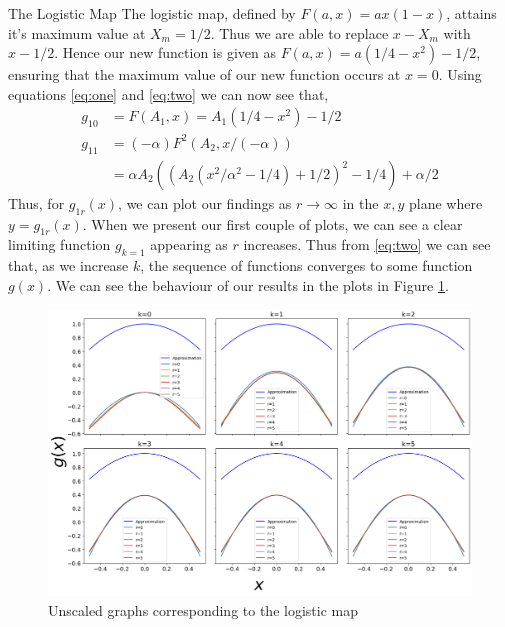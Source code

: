 \begin{exmp} The Logistic Map
	The logistic map, defined by $F(a,x)=ax(1-x)$, attains it's maximum value at $X_m =1/2$.
	Thus we are able to replace $x-X_m$ with $x-1/2$. Hence our new function is given as $F(a,x)=a(1/4-x^2)-1/2$, ensuring that the maximum value of our new function occurs at $x=0$. Using equations \eqref{eq:one} and \eqref{eq:two} we can now see that,
    \begin{align}
        g_{10}&=F(A_1,x)=A_1(1/4-x^2)-1/2 \nonumber \\
        g_{11}&=(-\alpha)F^2(A_2,x/(-\alpha)) \nonumber \\
        &= \alpha A_2 \left(\left(A_2 \left(x^{2}/\alpha^2 - 1/4\right) + 1/2\right)^{2} - 1/4\right) + \alpha/2
    \end{align}
    Thus, for $g_{1r}(x)$, we can plot our findings as $r \to \infty$ in the $x, y$ plane where $y=g_{1r}(x)$. 
	When we present our first couple of plots, we can see a clear limiting function $g_{k=1}$ appearing as $r$ increases. Thus from \eqref{eq:two} we can see that, as we increase $k$, the sequence of functions converges to some function $g(x)$. 
	We can see the behaviour of our results in the plots in Figure \ref{fig:unscaled}.
	\begin{figure}
    \centering    \includegraphics[width=1\textwidth]{Feigenbaum Approx Graphs/feignabum.png}
    \caption{Unscaled graphs corresponding to the logistic map}
    \label{fig:unscaled}
\end{figure}
    


\end{exmp}
